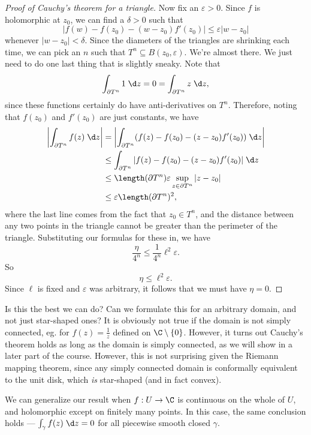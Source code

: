 \documentclass[a4paper]{article}
\begin{document}
\begin{proof}[Proof of Cauchy's theorem for a triangle]
  Now fix an $\varepsilon > 0$. Since $f$ is holomorphic at $z_0$, we can find a $\delta > 0$ such that
  \[
    |f(w) - f(z_0) - (w - z_0) f'(z_0)| \leq \varepsilon|w - z_0|
  \]
  whenever $|w - z_0| < \delta$. Since the diameters of the triangles are shrinking each time, we can pick an $n$ such that $T^n \subseteq B(z_0, \varepsilon)$. We're almost there. We just need to do one last thing that is slightly sneaky. Note that
  \[
    \int_{\partial T^n} 1 \;\d z = 0 = \int_{\partial T^n} z \;\d z,
  \]
  since these functions certainly do have anti-derivatives on $T^n$. Therefore, noting that $f(z_0)$ and $f'(z_0)$ are just constants, we have
  \begin{align*}
    \left|\int_{\partial T^n}f(z)\;\d z\right| &= \left|\int_{\partial T^n} (f(z) - f(z_0) - (z - z_0) f'(z_0))\;\d z\right|\\
    &\leq \int_{\partial T^n} |f(z) - f(z_0) - (z - z_0) f'(z_0)|\;\d z\\
    &\leq \length(\partial T^n) \varepsilon \sup_{z \in \partial T^n}|z - z_0|\\
    &\leq \varepsilon \length(\partial T^n)^2,
  \end{align*}
  where the last line comes from the fact that $z_0 \in T^n$, and the distance between any two points in the triangle cannot be greater than the perimeter of the triangle. Substituting our formulas for these in, we have
  \[
    \frac{\eta}{4^n}\leq \frac{1}{4^n} \ell^2 \varepsilon.
  \]
  So
  \[
    \eta \leq \ell^2 \varepsilon.
  \]
  Since $\ell$ is fixed and $\varepsilon$ was arbitrary, it follows that we must have $\eta = 0$.
\end{proof}
Is this the best we can do? Can we formulate this for an arbitrary domain, and not just star-shaped ones? It is obviously not true if the domain is not simply connected, eg. for $f(z) = \frac{1}{z}$ defined on $\C \setminus \{0\}$. However, it turns out Cauchy's theorem holds as long as the domain is simply connected, as we will show in a later part of the course. However, this is not surprising given the Riemann mapping theorem, since any simply connected domain is conformally equivalent to the unit disk, which \emph{is} star-shaped (and in fact convex).

We can generalize our result when $f: U \to \C$ is continuous on the whole of $U$, and holomorphic except on finitely many points. In this case, the same conclusion holds --- $\int_\gamma f(z)\;\d z = 0$ for all piecewise smooth closed $\gamma$.
\end{document}
